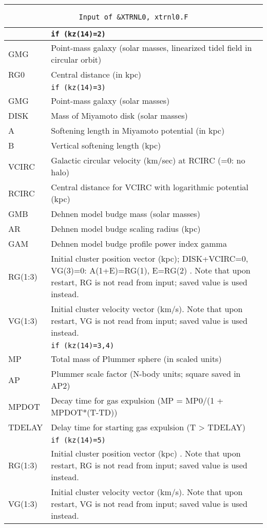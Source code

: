 \hrule
\noindent
\begin{longtable}{@{}p{1.5cm}p{13.0cm}}
\caption{\texttt{Input of \&XTRNL0, xtrnl0.F}}
\label{table:indata}\\\hline
       & \texttt{if (kz(14)=2)} \\\hline
GMG    & Point-mass galaxy (solar masses, linearized tidel field in circular orbit) \\
RG0    & Central distance (in kpc) \\\hline
       & \texttt{if (kz(14)=3)} \\\hline
GMG    & Point-mass galaxy (solar masses) \\
DISK   & Mass of Miyamoto disk (solar masses) \\
A      & Softening length in Miyamoto potential (in kpc) \\
B      & Vertical softening length (kpc) \\
VCIRC  & Galactic circular velocity (km/sec) at RCIRC (=0: no halo) \\
RCIRC  & Central distance for VCIRC with logarithmic potential (kpc) \\
GMB    & Dehnen model budge mass (solar masses)\\
AR     & Dehnen model budge scaling radius (kpc)\\
GAM    & Dehnen model budge profile power index gamma \\  
RG(1:3) & Initial cluster position vector (kpc); DISK+VCIRC=0, VG(3)=0: A(1+E)=RG(1), E=RG(2) . Note that upon restart, RG is not read from input; saved value is used instead.\\
VG(1:3) & Initial cluster velocity vector (km/s). Note that upon restart, VG is not read from input; saved value is used instead. \\\hline
       & \texttt{if (kz(14)=3,4)} \\\hline
MP     & Total mass of Plummer sphere (in scaled units) \\
AP     & Plummer scale factor (N-body units; square saved in AP2) \\
MPDOT  & Decay time for gas expulsion (MP = MP0/(1 + MPDOT*(T-TD)) \\
TDELAY & Delay time for starting gas expulsion (T > TDELAY) \\\hline
       & \texttt{if (kz(14)=5)} \\\hline
RG(1:3) & Initial cluster position vector (kpc) . Note that upon restart, RG is not read from input; saved value is used instead.\\
VG(1:3) & Initial cluster velocity vector (km/s). Note that upon restart, VG is not read from input; saved value is used instead. \\ 
\end{longtable}

